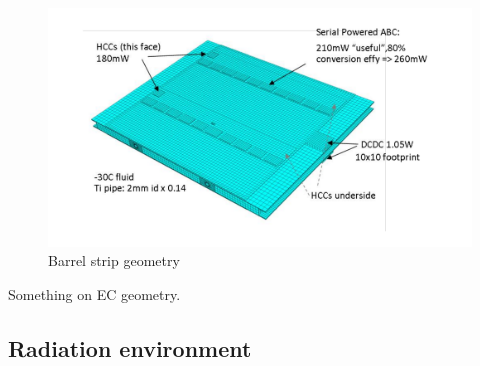 \begin{figure}[ht]
\centering
\includegraphics[width=0.4\linewidth]{figures/barrelmodule.pdf}
\caption{Barrel strip geometry}
\label{fig:barrelgeometry}
\end{figure}

Something on EC geometry.

\subsection{Radiation environment}

